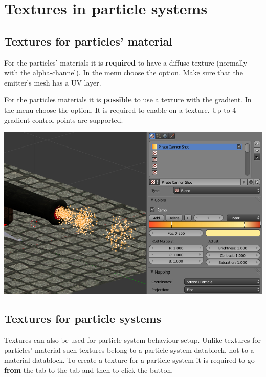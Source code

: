 \documentclass[a4paper,12pt,oneside]{sphinxmanual}
\begin{document}
\section{Textures in particle systems}
\label{particles:id14}\label{particles:particles-textures}

\subsection{Textures for particles' material}
\label{particles:id15}
For the  particles' materials it is \textbf{required} to have a diffuse texture (normally with the alpha-channel). In the  menu choose the  option.  Make sure that the emitter's mesh has a UV layer.

For the  particles materials it is \textbf{possible} to use a  texture with the  gradient. In the  menu choose the  option. It is required to enable  on a texture. Up to 4 gradient control points are supported.

{\hfill\includegraphics[width=1.000\linewidth]{particles_settings_ramp_color.jpg}\hfill}


\subsection{Textures for particle systems}
\label{particles:id16}
Textures can also be used for particle system behaviour setup. Unlike textures for particles' material such textures belong to a particle system datablock, not to a material datablock. To create a texture for a particle system it is required to go \textbf{from} the  tab to the  tab and then to click the  button.
\end{document}
